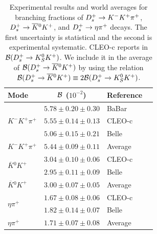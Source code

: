 \begin{table}[t!]
\caption{Experimental results and world averages for branching fractions of $D_{s}^+\to K^-K^+\pi^+$, $D_{s}^+\to \overline{K}{}^0K^+$, and
$D_{s}^+\to \eta\pi^+$ decays. The first uncertainty is statistical and the second is experimental systematic. CLEO-c reports in \cite{Onyisi:2013bjt}
${\cal B}(D_{s}^+\to K^0_SK^+)$. We include it in the average of ${\cal B}(D_{s}^+\to \overline{K}{}^0K^+)$ by using the relation ${\cal B}(D_{s}^+\to \overline{K}{}^0K^+)\equiv 2{\cal B}(D_{s}^+\to K^0_SK^+)$.
\label{tab:DSExpHadronic}}
\begin{center}
\begin{tabular}{lcll}
\toprule
\rowcolor{Gray} Mode 	& ${\cal{B}}$ ($10^{-2}$)				& Reference 	& \\ 
\midrule
\multirow{3}{*}{$K^-K^+\pi^+$}  & $5.78\pm0.20\pm 0.30$ 		& BaBar		& \cite{delAmoSanchez:2010jg}\\ 
						& $5.55\pm0.14\pm 0.13$ 		& CLEO-c		& \cite{Onyisi:2013bjt}\\ 
						& $5.06\pm0.15\pm 0.21$ 		& Belle   		& \cite{Zupanc:2013byn}\\
\midrule
\rowcolor{Gray}$K^-K^+\pi^+$	& $5.44\pm0.09\pm 0.11$			& Average & \\
\midrule
\multirow{2}{*}{$\overline{K}{}^0K^+$}		& $3.04\pm0.10\pm 0.06$ 		& CLEO-c		& \cite{Onyisi:2013bjt}\\ 
								& $2.95\pm0.11\pm 0.09$ 		& Belle   		& \cite{Zupanc:2013byn}\\
\midrule
\rowcolor{Gray}$\overline{K}{}^0K^+$		& $3.00\pm0.07\pm 0.05$			& Average & \\
\midrule
\multirow{2}{*}{$\eta\pi^+$}  	& $1.67\pm0.08\pm 0.06$ 		& CLEO-c		& \cite{Onyisi:2013bjt}\\ 
						& $1.82\pm0.14\pm 0.07$ 		& Belle   		& \cite{Zupanc:2013byn}\\
\midrule
\rowcolor{Gray}$\eta\pi^+$	& $1.71\pm0.07\pm 0.08$			& Average & 
\\ \bottomrule
\end{tabular}
\end{center}
\end{table}

